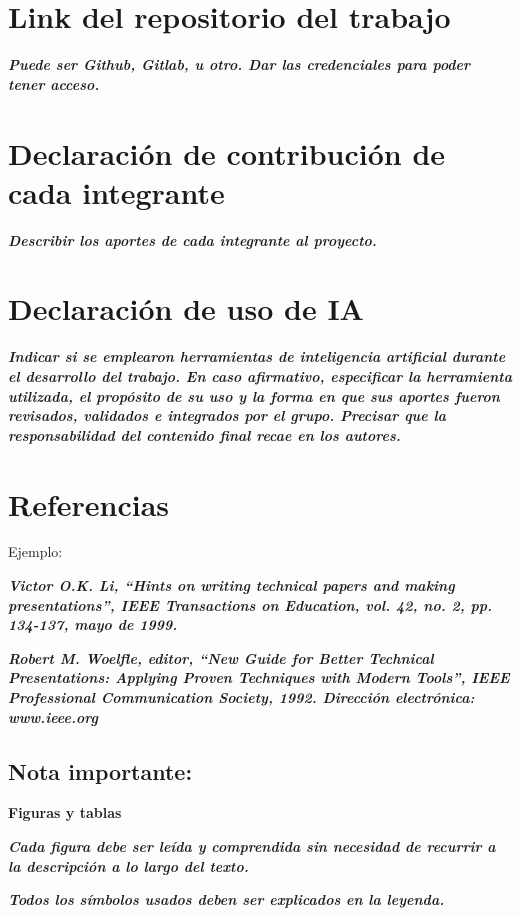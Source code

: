 \section{Link del repositorio del trabajo}
\textbf{\textit{Puede ser Github, Gitlab, u otro. Dar las credenciales para poder tener acceso.}}

\section{Declaración de contribución de cada integrante}
\textbf{\textit{Describir los aportes de cada integrante al proyecto.}}

\section{Declaración de uso de IA}
\textbf{\textit{Indicar si se emplearon herramientas de inteligencia artificial durante el desarrollo del trabajo. En caso afirmativo, especificar la herramienta utilizada, el propósito de su uso y la forma en que sus aportes fueron revisados, validados e integrados por el grupo. Precisar que la responsabilidad del contenido final recae en los autores.}}

\section{Referencias}
{\color{lightmint}\fontsize{9}{11}\selectfont
Ejemplo:

\textbf{\textit{Victor O.K. Li, “Hints on writing technical papers and making presentations”, IEEE Transactions on Education, vol. 42, no. 2, pp. 134-137, mayo de 1999.}}

\textbf{\textit{Robert M. Woelfle, editor, “New Guide for Better Technical Presentations: Applying Proven Techniques with Modern Tools”, IEEE Professional Communication Society, 1992. Dirección electrónica: www.ieee.org}}
}




\subsection*{Nota importante:}
{\color{lightmint}\fontsize{9}{11}\selectfont
\begin{center}
\textbf{Figuras y tablas}
\end{center}
\textbf{\textit{Cada figura debe ser leída y comprendida sin necesidad de recurrir a la descripción a lo largo del texto.}}

\textbf{\textit{Todos los símbolos usados deben ser explicados en la leyenda.}}
}
